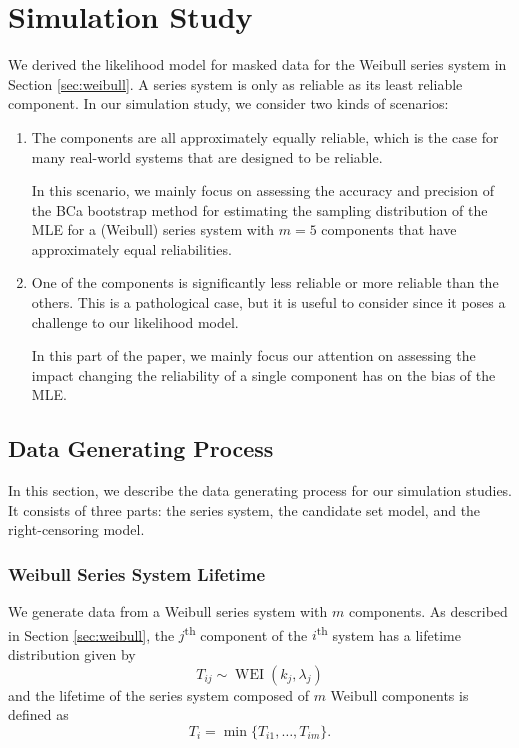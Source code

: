\documentclass[
]{article}
\begin{document}
\hypertarget{simstudy}{%
\section{Simulation Study}\label{simstudy}}

We derived the likelihood model for masked data for the Weibull series
system in Section \ref{sec:weibull}. A series system is only as reliable
as its least reliable component. In our simulation study, we consider
two kinds of scenarios:

\begin{enumerate}
\def\labelenumi{\arabic{enumi}.}
\item
  The components are all approximately equally reliable, which is the
  case for many real-world systems that are designed to be reliable.

  In this scenario, we mainly focus on assessing the accuracy and
  precision of the BCa bootstrap method for estimating the sampling
  distribution of the MLE for a (Weibull) series system with \(m=5\)
  components that have approximately equal reliabilities.
\item
  One of the components is significantly less reliable or more reliable
  than the others. This is a pathological case, but it is useful to
  consider since it poses a challenge to our likelihood model.

  In this part of the paper, we mainly focus our attention on assessing
  the impact changing the reliability of a single component has on the
  bias of the MLE.
\end{enumerate}

\hypertarget{sec:data_gen}{%
\subsection{Data Generating Process}\label{sec:data_gen}}

In this section, we describe the data generating process for our
simulation studies. It consists of three parts: the series system, the
candidate set model, and the right-censoring model.

\hypertarget{weibull-series-system-lifetime}{%
\subsubsection*{Weibull Series System
Lifetime}\label{weibull-series-system-lifetime}}

We generate data from a Weibull series system with \(m\) components. As
described in Section \ref{sec:weibull}, the \(j\)\textsuperscript{th}
component of the \(i\)\textsuperscript{th} system has a lifetime
distribution given by \[
    T_{i j} \sim \operatorname{WEI}(k_j, \lambda_j)
\] and the lifetime of the series system composed of \(m\) Weibull
components is defined as \[
    T_i = \min\{T_{i 1}, \ldots, T_{i m}\}.
\]
\end{document}
